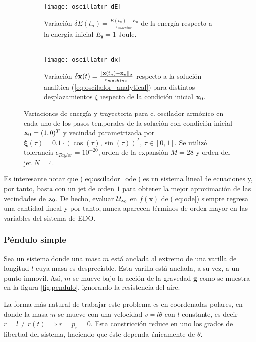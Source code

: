  \begin{figure}[h!]
\centering
\begin{subfigure}{0.49\textwidth}
	\centering
	\texttt{[image: oscillator\_dE]}
	\caption{Variación $\delta E(t_n) = \frac{E(t_n)-E_0}{\epsilon_{machine}}$ de la energía respecto a la energía inicial $E_0 = 1$ Joule.\\ \\ }
	\label{fig:oscillator_dE}
\end{subfigure}
%
\begin{subfigure}{0.49\textwidth}
	\centering
	\texttt{[image: oscillator\_dx]}
	\caption{Variación $\delta \mathbf{x}(t) =  \frac{\left\lVert\mathbf{x}(t_n) - \mathbf{x_n}\right\rVert_2}{\epsilon_{machine}}$ respecto a la solución analítica (\ref{eq:oscilador_analytical}) para distintos desplazamientos $\xi$ respecto de la condición inicial $\mathbf{x}_0$.}
	\label{fig:oscillator_dx}
\end{subfigure}
\caption{Variaciones de energía y trayectoria para el oscilador armónico en cada uno de los pasos temporales de la solución con condición inicial $\mathbf{x}_0 = (1,0)^T$ y vecindad parametrizada por  $\mathbf{\xi}(\tau) = 0.1\cdot \left( \cos(\tau), \sin(\tau) \right)^T$, $\tau \in [0,1]$. Se utilizó tolerancia $\epsilon_{Taylor} = 10^{-20}$, orden de la expansión $M = 28$ y orden del jet $N=4$.}
\label{fig:oscillator_deltas}
\end{figure}

Es interesante notar que (\ref{eq:oscilador_ode}) es un sistema lineal de ecuaciones y, por tanto, basta con un jet de orden $1$ para obtener la mejor aproximación de las vecindades de $\mathbf{x}_0$. De hecho, evaluar $\mathcal{U}_{\mathbf{x}_0}$ en $f(\mathbf{x})$ de (\ref{eq:ode}) siempre regresa una cantidad lineal y por tanto, nunca aparecen términos de orden mayor en las variables del sistema de EDO.

\subsubsection{Péndulo simple}
\label{sec:pendulo}
Sea un sistema donde una masa $m$ está anclada al extremo de una varilla de longitud $l$ cuya masa es despreciable. Esta varilla está anclada, a su vez, a un punto inmovil. Así, $m$ se mueve bajo la acción de la gravedad $\mathbf{g}$ como se muestra en la figura \ref{fig:pendulo}, ignorando la resistencia del aire.



La forma más natural de trabajar este problema es en coordenadas polares, en donde la masa $m$ se mueve con una velocidad $v = l\dot{\theta}$ con $l$ constante, es decir $r = l \neq r(t) \implies \dot{r} = \dot{p_r} = 0$. Esta constricción reduce en uno los grados de libertad del sistema, haciendo que éste dependa únicamente de $\theta$. 


